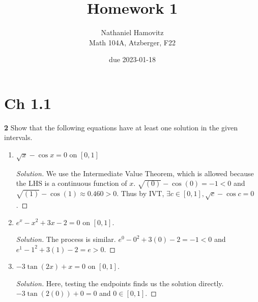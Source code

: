\documentclass{article}
\begin{document}


\title{Homework 1} %
\author{Nathaniel Hamovitz\\Math 104A, Atzberger, F22}
\date{due 2023-01-18}

\maketitle
\setlength{\parindent}{0cm}



\section{Ch 1.1}


\textbf{2}  %
Show that the following equations have at least one solution in the given intervals.
\renewcommand{\labelenumi}{\textbf{\alph{enumi}.}}
\begin{enumerate}
    \item
    $\sqrt{x} - \cos x = 0$ on $[0, 1]$
    \begin{proof}[Solution]
        We use the Intermediate Value Theorem, which is allowed because the LHS is a continuous function of $x$. $\sqrt{(0)} - \cos (0) = -1 < 0$ and $\sqrt{(1)} - \cos (1) \approx 0.460 > 0$. Thus by IVT, $\exists c \in [0, 1], \sqrt{c} - \cos c = 0$.
    \end{proof}

    \item 
    $e^x - x^2 + 3x - 2 = 0$ on $[0, 1]$.
    \begin{proof}[Solution]
        The process is similar. $e^0 - 0^2 + 3(0) - 2 = -1 < 0$ and $e^1 - 1^2 + 3(1) - 2 = e > 0$.
    \end{proof}

    \item 
    $-3 \tan(2x) + x = 0$ on $[0, 1]$.
    \begin{proof}[Solution]
        Here, testing the endpoints finds us the solution directly. $-3 \tan(2(0)) + 0 = 0$ and $0 \in [0, 1]$.
    \end{proof}
\end{enumerate}
\end{document}
